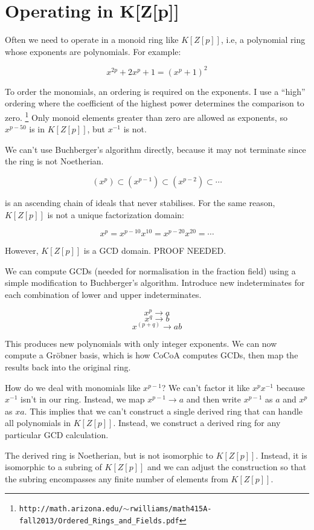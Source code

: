 \documentclass{article}
\begin{document}
\vfill\eject
\section*{Operating in K[Z[p]]}

Often we need to operate in a monoid ring like $K[Z[p]]$, i.e, a
polynomial ring whose exponents are polynomials.  For example:

$$x^{2p}+2x^p+1=(x^p+1)^2$$

To order the monomials, an ordering is required on the exponents.  I use a ``high''
ordering where the coefficient of the highest power determines the comparison to zero.
\footnote{\tt http://math.arizona.edu/$\sim$rwilliams/math415A-fall2013/Ordered\_Rings\_and\_Fields.pdf}
Only monoid elements greater than zero are allowed as exponents, so $x^{p-50}$ is
in $K[Z[p]]$, but $x^{-1}$ is not.

We can't use Buchberger's algorithm directly, because it may not terminate since
the ring is not Noetherian.

$$(x^p) \subset (x^{p-1}) \subset (x^{p-2}) \subset \cdots$$

is an ascending chain of ideals that never stabilises.
For the same reason, $K[Z[p]]$ is not a unique factorization domain:

$$x^p = x^{p-10}x^{10} = x^{p-20}x^{20} = \cdots$$

However, $K[Z[p]]$ is a GCD domain.  PROOF NEEDED.

We can compute GCDs (needed for normalisation in the fraction field) using a
simple modification to Buchberger's algorithm.  Introduce new indeterminates
for each combination of lower and upper indeterminates.

$$x^p  \to  a$$
$$x^q  \to  b$$
$$x^{(p+q)} \to ab$$

This produces new polynomials with only integer exponents.  We can now
compute a Gr\"obner basis, which is how CoCoA computes GCDs, then map
the results back into the original ring.

How do we deal with monomials like $x^{p-1}$?  We can't factor it like
$x^px^{-1}$ because $x^{-1}$ isn't in our ring.  Instead, we map
$x^{p-1} \to a$ and then write $x^{p-1}$ as $a$ and $x^p$ as $xa$.
This implies that we can't construct a single derived ring that can
handle all polynomials in $K[Z[p]]$.  Instead, we construct a
derived ring for any particular GCD calculation.

The derived ring is Noetherian, but is not isomorphic to $K[Z[p]]$.
Instead, it is isomorphic to a subring of $K[Z[p]]$ and we can adjust
the construction so that the subring encompasses any finite number of
elements from $K[Z[p]]$.
\end{document}
